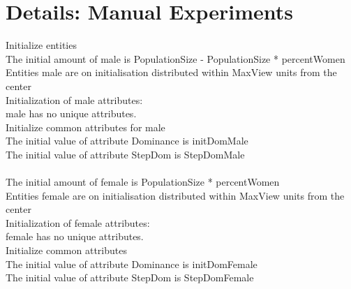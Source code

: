 \documentclass{article}
\begin{document}
\section{Details: Manual Experiments}                                                                                               
Initialize entities\\                                                                                     
The initial amount of {\color{blue}male} is {\color{blue}PopulationSize} - {\color{blue}PopulationSize} * {\color{blue}percentWomen}\\                                          
Entities {\color{blue}male} are on initialisation distributed within {\color{blue}MaxView}  units from the center\\                        
Initialization of male attributes:\\                                  
{\color{blue}male} has no unique attributes.\\                                                                                      
Initialize common attributes for {\color{blue}male}\\                                                                                              
The initial value of attribute {\color{blue}Dominance} is {\color{blue}initDomMale}\\                                                                   
The initial value of attribute {\color{blue}StepDom} is {\color{blue}StepDomMale}\\ 
\\
The initial amount of {\color{blue}female} is {\color{blue}PopulationSize} * {\color{blue}percentWomen}\\                         
Entities {\color{blue}female} are on initialisation distributed within {\color{blue}MaxView}  units from the center\\                             
Initialization of {\color{blue}female} attributes:\\                                
female has no unique attributes.\\
Initialize common attributes \\
The initial value of attribute {\color{blue}Dominance} is {\color{blue}initDomFemale}\\                          
The initial value of attribute {\color{blue}StepDom} is {\color{blue}StepDomFemale}\\
\\
\end{document}
